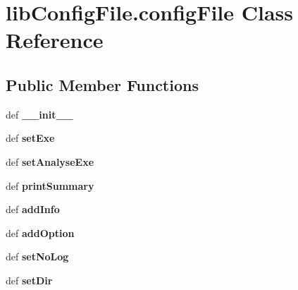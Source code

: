 \hypertarget{classlibConfigFile_1_1configFile}{\section{lib\-Config\-File.\-config\-File Class Reference}
\label{classlibConfigFile_1_1configFile}
}
\subsection*{Public Member Functions}
\begin{DoxyCompactItemize}
\item 
\hypertarget{classlibConfigFile_1_1configFile_af4c94177c81e4dfb434be4f1d88eab53}{def {\bfseries \-\_\-\-\_\-init\-\_\-\-\_\-}}\label{classlibConfigFile_1_1configFile_af4c94177c81e4dfb434be4f1d88eab53}

\item 
\hypertarget{classlibConfigFile_1_1configFile_a4fdf6ac9af106315801d1cb3751caee0}{def {\bfseries set\-Exe}}\label{classlibConfigFile_1_1configFile_a4fdf6ac9af106315801d1cb3751caee0}

\item 
\hypertarget{classlibConfigFile_1_1configFile_ad0629f4b71ed36b8134480f2263490d7}{def {\bfseries set\-Analyse\-Exe}}\label{classlibConfigFile_1_1configFile_ad0629f4b71ed36b8134480f2263490d7}

\item 
\hypertarget{classlibConfigFile_1_1configFile_aa622f7e779888d4e71c5bc0d69602387}{def {\bfseries print\-Summary}}\label{classlibConfigFile_1_1configFile_aa622f7e779888d4e71c5bc0d69602387}

\item 
\hypertarget{classlibConfigFile_1_1configFile_a9b151fd50ec0ea3332a59dc9335f7a98}{def {\bfseries add\-Info}}\label{classlibConfigFile_1_1configFile_a9b151fd50ec0ea3332a59dc9335f7a98}

\item 
\hypertarget{classlibConfigFile_1_1configFile_afaaf3354111b13c73bcd4e8c5d422f1e}{def {\bfseries add\-Option}}\label{classlibConfigFile_1_1configFile_afaaf3354111b13c73bcd4e8c5d422f1e}

\item 
\hypertarget{classlibConfigFile_1_1configFile_a5d257021c91435d30e31173f53a72284}{def {\bfseries set\-No\-Log}}\label{classlibConfigFile_1_1configFile_a5d257021c91435d30e31173f53a72284}

\item 
\hypertarget{classlibConfigFile_1_1configFile_adcd49023dd08211f8403c04045fe7a8f}{def {\bfseries set\-Dir}}\label{classlibConfigFile_1_1configFile_adcd49023dd08211f8403c04045fe7a8f}


\end{DoxyCompactItemize}
